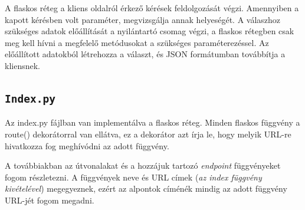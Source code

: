 A flaskos réteg a kliens oldalról érkező kérések feldolgozását végzi. Amennyiben a kapott kérésben volt paraméter, megvizsgálja annak helyeségét. A válaszhoz szükséges adatok előállítását a nyilántartó csomag végzi, a flaskos rétegben csak meg kell hívni a megfelelő metódusokat a szükséges paraméterezéssel. Az előállított adatokból létrehozza a választ, és JSON formátumban továbbítja a kliensnek.

\subsection{\texttt{Index.py}}

Az index.py fájlban van implementálva a flaskos réteg. Minden flaskos függvény a route() dekorátorral van ellátva, ez a dekorátor azt írja le, hogy melyik URL-re hivatkozza fog meghívódni az adott függvény.

A továbbiakban az útvonalakat és a hozzájuk tartozó \textit{endpoint} függvényeket fogom részletezni.
A függvények neve és URL címek (\textit{az index függvény kivételével}) megegyeznek, ezért az alpontok címénék mindig az adott függvény URL-jét fogom megadni.

